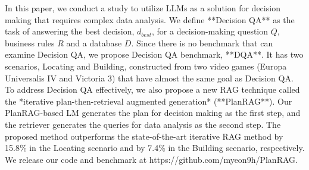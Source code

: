 In this paper, we conduct a study to utilize LLMs as a solution for decision making that requires complex data analysis. We define **Decision QA** as the task of answering the best decision, $d_{best}$, for a decision-making question $Q$, business rules $R$ and a database $D$. Since there is no benchmark that can examine Decision QA, we propose Decision QA benchmark, **DQA**. It has two scenarios, Locating and Building, constructed from two video games (Europa Universalis IV and Victoria 3) that have almost the same goal as Decision QA. To address Decision QA effectively, we also propose a new RAG technique called the *iterative plan-then-retrieval augmented generation* (**PlanRAG**). Our PlanRAG-based LM generates the plan for decision making as the first step, and the retriever generates the queries for data analysis as the second step. The proposed method outperforms the state-of-the-art iterative RAG method by 15.8\% in the Locating scenario and by 7.4\% in the Building scenario, respectively. We release our code and benchmark at https://github.com/myeon9h/PlanRAG.